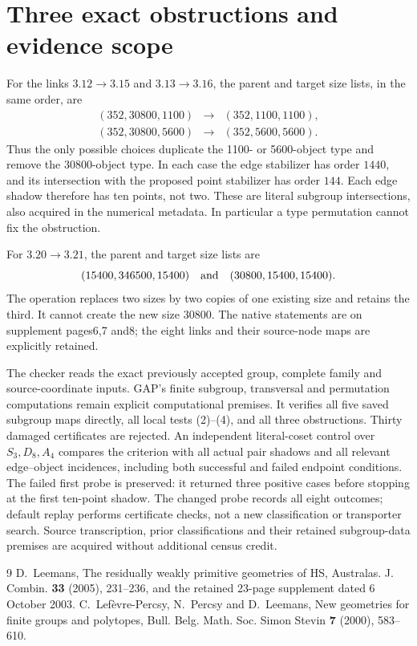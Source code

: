 \documentclass[11pt]{article}
\begin{document}
\section{Three exact obstructions and evidence scope}
For the links $3.12\to3.15$ and $3.13\to3.16$, the parent and target
size lists, in the same order, are
\[
\begin{array}{ccl}
(352,30800,1100)&\longrightarrow&(352,1100,1100),\\
(352,30800,5600)&\longrightarrow&(352,5600,5600).
\end{array}
\]
Thus the only possible choices duplicate the 1100- or 5600-object type
and remove the 30800-object type. In each case the edge stabilizer has
order $1440$, and its intersection with the proposed point stabilizer has
order $144$. Each edge shadow therefore has ten points, not two. These
are literal subgroup intersections, also acquired in the numerical
metadata. In particular a type permutation cannot fix the obstruction.

For $3.20\to3.21$, the parent and target size lists are
\[
(15400,346500,15400)\quad\hbox{and}\quad(30800,15400,15400).
\] The operation replaces two sizes by two copies
of one existing size and retains the third. It cannot create the new
size $30800$. The native statements are on supplement pages6,7 and8;
the eight links and their source-node maps are explicitly retained.

The checker reads the exact previously accepted group, complete family
and source-coordinate inputs. GAP's finite subgroup, transversal and
permutation computations remain explicit computational premises. It
verifies all five saved subgroup maps directly, all local tests (2)--(4),
and all three obstructions. Thirty damaged certificates are rejected.
An independent literal-coset control over $S_3,D_8,A_4$ compares the
criterion with all actual pair shadows and all relevant edge--object
incidences, including both successful and failed endpoint conditions.
The failed first probe is preserved: it returned three positive cases
before stopping at the first ten-point shadow. The changed probe
records all eight outcomes; default replay performs certificate checks,
not a new classification or transporter search. Source transcription,
prior classifications and their retained subgroup-data premises are
acquired without additional census credit.

\begin{thebibliography}{9}
 D.~Leemans, The residually weakly primitive geometries of HS,
Australas. J. Combin. \textbf{33} (2005), 231--236, and the retained
23-page supplement dated 6 October 2003.
 C.~Lef\`evre-Percsy, N.~Percsy and D.~Leemans,
New geometries for finite groups and polytopes,
Bull. Belg. Math. Soc. Simon Stevin \textbf{7} (2000), 583--610.
\end{thebibliography}
\end{document}

